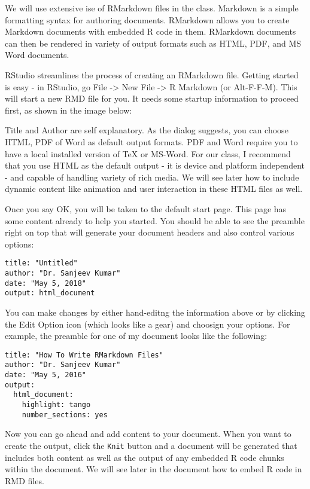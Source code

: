 \documentclass[
]{krantz}
\begin{document}
We will use extensive ise of RMarkdown files in the class. Markdown is a simple formatting syntax for authoring documents. RMarkdown allows you to create Markdown documents with embedded R code in them. RMarkdown documents can then be rendered in variety of output formats such as HTML, PDF, and MS Word documents.

RStudio streamlines the process of creating an RMarkdown file. Getting started is easy - in RStudio, go File -\textgreater{} New File -\textgreater{} R Markdown (or Alt-F-F-M). This will start a new RMD file for you. It needs some startup information to proceed first, as shown in the image below:

Title and Author are self explanatory. As the dialog suggests, you can choose HTML, PDF of Word as default output formats. PDF and Word require you to have a local installed version of TeX or MS-Word. For our class, I recommend that you use HTML as the default output - it is device and platform independent - and capable of handling variety of rich media. We will see later how to include dynamic content like animation and user interaction in these HTML files as well.

Once you say OK, you will be taken to the default start page. This page has some content already to help you started. You should be able to see the preamble right on top that will generate your document headers and also control various options:

\begin{verbatim}
title: "Untitled"
author: "Dr. Sanjeev Kumar"
date: "May 5, 2018"
output: html_document
\end{verbatim}

You can make changes by either hand-editng the information above or by clicking the Edit Option icon (which looks like a gear) and choosign your options. For example, the preamble for one of my document looks like the following:

\begin{verbatim}
title: "How To Write RMarkdown Files"
author: "Dr. Sanjeev Kumar"
date: "May 5, 2016"
output:
  html_document: 
    highlight: tango
    number_sections: yes
\end{verbatim}

Now you can go ahead and add content to your document. When you want to create the output, click the \texttt{Knit} button and a document will be generated that includes both content as well as the output of any embedded R code chunks within the document. We will see later in the document how to embed R code in RMD files.
\end{document}
